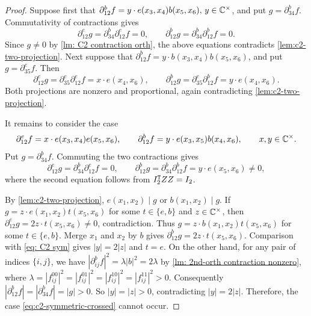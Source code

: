 \begin{proof}
    
    Suppose first that
    $\partial_{12}^bf=y\cdot e(x_3,x_4)b(x_5,x_6),\,y\in\mathbb{C}^\times$, and put $g=\partial_{34}^{b}f$.  Commutativity of contractions gives
    \[
     \partial_{12}^{e}g
     =\partial_{34}^{b}\partial_{12}^{e}f=0,
     \qquad
     \partial_{12}^{b}g
     =\partial_{34}^{b}\partial_{12}^{b}f=0.
    \]
    Since $g\neq 0$ by \cref{lm: C2 contraction orth}, the above equations contradicts \cref{lem:c2-two-projection}.
    Next suppose that $\partial_{12}^{b}f=y\cdot b(x_3,x_4)b(x_5,x_6)$, and put $g=\partial_{35}^{e}f$.  Then
    \[
     \partial_{12}^{e}g
     =\partial_{35}^{e}\partial_{12}^{e}f=x\cdot e(x_4,x_6),
     \qquad
     \partial_{12}^{b}g
     =\partial_{35}^{e}\partial_{12}^{b}f=y\cdot e(x_4,x_6).
    \]
    Both projections are nonzero and proportional, again contradicting
    \cref{lem:c2-two-projection}.

    It remains to consider the case
    \begin{equation}
        \partial_{12}^{e}f=x\cdot e(x_3,x_4)e(x_5,x_6),
         \qquad
         \partial_{12}^{b}f=y\cdot e(x_3,x_5)b(x_4,x_6),\qquad x,y\in \mathbb{C}^\times.
         \label{eq:c2-symmetric-crossed}
    \end{equation}
    Put $g=\partial_{34}^{b}f$.  Commuting the two contractions gives
    \begin{equation}\label{eq: C2 sym}
        \partial_{12}^{e}g=\partial_{34}^b\partial_{12}^ef=0,
     \qquad
     \partial_{12}^{b}g=\partial_{34}^b\partial_{12}^bf=y\cdot e(x_5,x_6)\ne0,
    \end{equation}
    where the second equation follows from $I_2^{\tt T}ZZ=I_2$.

    By \cref{lem:c2-two-projection}, $e(x_1,x_2)\mid g$ or $b(x_1,x_2)\mid g$.
    If $g=z\cdot e(x_1,x_2)t(x_5,x_6)$ for some $t\in \{e,b\}$ and $z\in \mathbb{C}^\times$, then $\partial_{12}^e g=2z\cdot t(x_5,x_6)\neq 0$, contradiction.
    Thus
    $g=z\cdot b(x_1,x_2)t(x_5,x_6)$ for some $t\in\{e,b\}$.  
    Merge $x_1$ and $x_2$ by $b$ gives
    \(
     \partial_{12}^{b}g=2z\cdot t(x_5,x_6).
    \)
    Comparison with \eqref{eq: C2 sym} gives $|y|=2|z|$ and $t=e$.
    On the other hand, for any pair of indices $\{i,j\}$, we have $|\partial_{ij}^bf|^2=\lambda|b|^2=2\lambda$ by \cref{lm: 2nd-orth contraction nonzero}, where $\lambda=|f_{ij}^{00}|^2=|f_{ij}^{01}|^2=|f_{ij}^{10}|^2=|f_{ij}^{11}|^2>0$.
    Consequently $|\partial_{12}^{b}f|=|\partial_{34}^{b}f|=|g|>0$.
    So $|y|=|z|>0$, contradicting $|y|=2|z|$.
    Therefore, the case \eqref{eq:c2-symmetric-crossed} cannot occur.
\end{proof}


